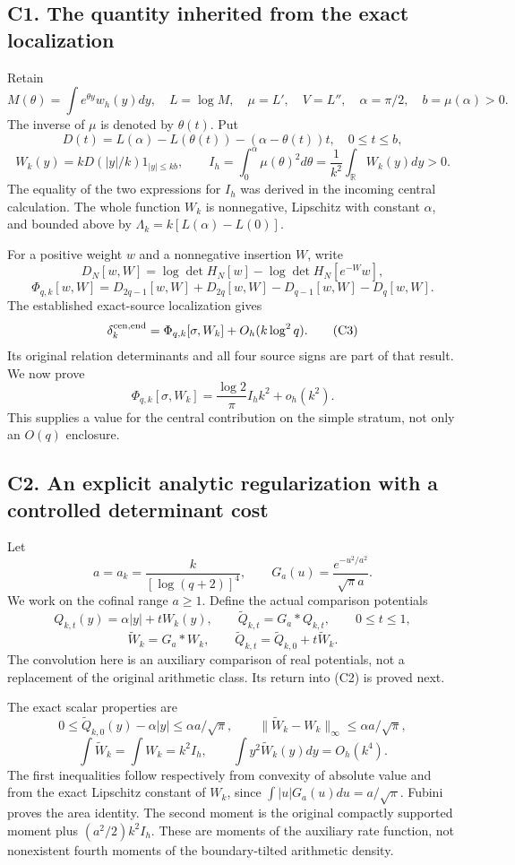 \documentclass[11pt,a4paper]{article}
\begin{document}
\subsection{C1. The quantity inherited from the exact
localization}\label{sa:c1.-the-quantity-inherited-from-the-exact-localization}

Retain \[
M(\theta)=\int e^{\theta y}w_h(y)dy,\quad L=\log M,
\quad \mu=L',\quad V=L'',\quad \alpha=\pi/2,
\quad b=\mu(\alpha)>0.
\] The inverse of \(\mu\) is denoted by \(\theta(t)\). Put \[
D(t)=L(\alpha)-L(\theta(t))-(\alpha-\theta(t))t,
\quad0\le t\le b,
\] \[
W_k(y)=kD(|y|/k)1_{|y|\le kb},\qquad
I_h=\int_0^\alpha\mu(\theta)^2d\theta
=\frac1{k^2}\int_{\mathbb R}W_k(y)dy>0.
\tag{C1}
\] The equality of the two expressions for \(I_h\) was derived in the
incoming central calculation. The whole function \(W_k\) is nonnegative,
Lipschitz with constant \(\alpha\), and bounded above by
\(\Lambda_k=k[L(\alpha)-L(0)]\).

For a positive weight \(w\) and a nonnegative insertion \(W\), write \[
D_N[w,W]=\log\det H_N[w]-\log\det H_N[e^{-W}w],
\] \[
\Phi_{q,k}[w,W]=D_{2q-1}[w,W]+D_{2q}[w,W]
-D_{q-1}[w,W]-D_q[w,W].\tag{C2}
\] The established exact-source localization gives \[
\delta_k^{\rm cen,end}
=\Phi_{q,k}[\sigma,W_k]+O_h(k\log^2q).
\tag{C3}
\] Its original relation determinants and all four source signs are part
of that result. We now prove \[
\boxed{\Phi_{q,k}[\sigma,W_k]
=\frac{\log2}{\pi}I_h k^2+o_h(k^2).}\tag{C4}
\] This supplies a value for the central contribution on the simple
stratum, not only an \(O(q)\) enclosure.

\subsection{C2. An explicit analytic regularization with a controlled
determinant
cost}\label{sa:c2.-an-explicit-analytic-regularization-with-a-controlled-determinant-cost}

Let \[
a=a_k=\frac{k}{[\log(q+2)]^4},\qquad
G_a(u)=\frac{e^{-u^2/a^2}}{\sqrt\pi a}.
\] We work on the cofinal range \(a\ge1\). Define the actual comparison
potentials \[
Q_{k,t}(y)=\alpha|y|+tW_k(y),\qquad
\widetilde Q_{k,t}=G_a*Q_{k,t},\qquad0\le t\le1,
\] \[
\widetilde W_k=G_a*W_k,
\qquad \widetilde Q_{k,t}=\widetilde Q_{k,0}+t\widetilde W_k.
\tag{C5}
\] The convolution here is an auxiliary comparison of real potentials,
not a replacement of the original arithmetic class. Its return into (C2)
is proved next.

The exact scalar properties are \[
0\le\widetilde Q_{k,0}(y)-\alpha|y|\le\alpha a/\sqrt\pi,
\qquad
\|\widetilde W_k-W_k\|_\infty\le\alpha a/\sqrt\pi,
\tag{C6}
\] \[
\int\widetilde W_k=\int W_k=k^2I_h,
\qquad
\int y^2\widetilde W_k(y)dy=O_h(k^4).
\tag{C7}
\] The first inequalities follow respectively from convexity of absolute
value and from the exact Lipschitz constant of \(W_k\), since
\(\int|u|G_a(u)du=a/\sqrt\pi\). Fubini proves the area identity. The
second moment is the original compactly supported moment plus
\((a^2/2)k^2I_h\). These are moments of the auxiliary rate function, not
nonexistent fourth moments of the boundary-tilted arithmetic density.
\end{document}
